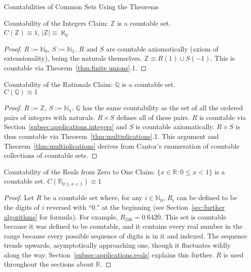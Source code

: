 \documentclass[12pt]{article}
\begin{document}
\begin{section}{Countabilities of Common Sets Using the Theorems}\label{sec:applications}
	\begin{subsection}{Countability of the Integers}\label{subsec:applications.integers}
		Claim: $\mathbb Z$ is a countable set.\\
		\indent$C(\mathbb Z)\equiv1$,
		\hspace{2em}
		$|\mathbb Z|\equiv\aleph_0$
		\begin{proof}
			$R:=\mathbb N_0$, $S:=\mathbb N_1$. $R$ and $S$ are countable axiomatically
			(axiom of extensionality), being the naturals themselves. $\mathbb Z\equiv
			R(1)\cup S(-1)$. This is countable via Theorem~\ref{thm:finite unions}.1.
		\end{proof}
	\end{subsection}

	\begin{subsection}{Countability of the Rationals}\label{subsec:applications.rationals}
		Claim: $\mathbb Q$ is a countable set.\\
		\indent$C(\mathbb Q)\equiv1$
		\begin{proof}
			$R:=\mathbb Z$, $S:=\mathbb N_1$. $\mathbb Q$ has the same countability as the set of all
			the ordered pairs of integers with naturals. $R\times S$ defines all of these pairs. $R$
			is countable via Section~\ref{subsec:applications.integers} and $S$ is countable
			axiomatically. $R\times S$ is thus countable via Theorem~\ref{thm:multiplications}.1.
			This argument and Theorem~\ref{thm:multiplications} derives from Cantor's enumeration of
			countable collections of countable sets.
		\end{proof}
	\end{subsection}

	\begin{subsection}{Countability of the Reals from Zero to One}\label{subsec:applications.reals 0 to 1}
		Claim: $\{x\in\mathbb R:0\leqslant x<1\}$ is a countable set.
		\hspace{2em}$C(\mathbb R_{0\leqslant x<1})\equiv1$
		\begin{proof}
			Let $R$ be a countable set where, for any $i\in\mathbb N_0$, $R_i$ can be defined to be
			the digits of $i$ reversed with ``0." at the beginning (see Section~\ref{sec:further algorithms}
			for formula). For example, $R_{246}=0.642\overline0$. This set is countable because it
			was defined to be countable, and it contains every real number in the range because every
			possible sequence of digits is in it and indexed. The sequence trends upwards,
			asymptotically approaching one, though it fluctuates wildly along the way.
			Section~\ref{subsec:applications.reals} explains this further. $R$ is used throughout the
			sections about $\mathbb R$.
		\end{proof}
	\end{subsection}


\end{section}
\end{document}
